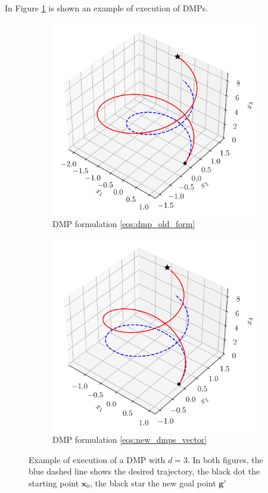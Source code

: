 \documentclass[fleqn, 11pt]{article}
\theoremstyle{definition}
\theoremstyle{plain}
\theoremstyle{remark}
\begin{document}
In Figure \ref{fig:dmp_demo_draw2d} is shown an example of execution of DMPs.

\begin{figure}[tbp]
    \centering
    \begin{subfigure}{0.45\linewidth}
        \includegraphics[width=\textwidth]{imgs/demo_dmp_old_3d.png}
        \caption{DMP formulation \eqref{eqs:dmp_old_form}}
    \end{subfigure}
    \hfill
    \begin{subfigure}{0.45\linewidth}
        \includegraphics[width=\textwidth]{imgs/demo_dmp_new_3d.png}
        \caption{DMP formulation \eqref{eqs:new_dmps_vector}}
    \end{subfigure}
    \caption{Example of execution of a DMP with $ d = 3 $.
        In both figures, the blue dashed line shows the desired trajectory, the black dot the starting point $ \mathbf{x}_0 $, the black star the new goal point $ \mathbf{g} ' $
    }
    \label{fig:dmp_demo_draw2d}
\end{figure}
\end{document}
